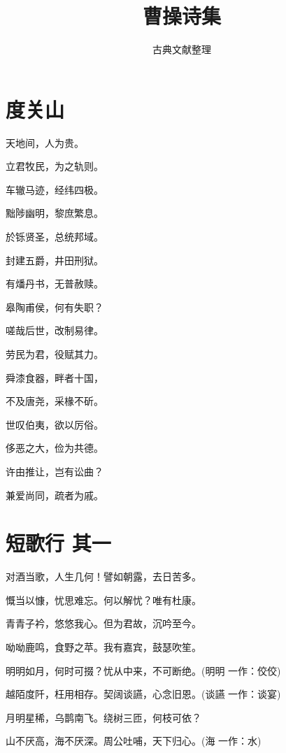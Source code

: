 \documentclass[12pt,a4paper]{ctexbook}
\title{曹操诗集}
\author{古典文献整理}
\date{}
\begin{document}
\maketitle
\tableofcontents
\newpage
\section{度关山}
天地间，人为贵。\par
立君牧民，为之轨则。\par
车辙马迹，经纬四极。\par
黜陟幽明，黎庶繁息。\par
於铄贤圣，总统邦域。\par
封建五爵，井田刑狱。\par
有燔丹书，无普赦赎。\par
皋陶甫侯，何有失职？\par
嗟哉后世，改制易律。\par
劳民为君，役赋其力。\par
舜漆食器，畔者十国，\par
不及唐尧，采椽不斫。\par
世叹伯夷，欲以厉俗。\par
侈恶之大，俭为共德。\par
许由推让，岂有讼曲？\par
兼爱尚同，疏者为戚。\par

\section{短歌行 其一}
对酒当歌，人生几何！譬如朝露，去日苦多。\par
慨当以慷，忧思难忘。何以解忧？唯有杜康。\par
青青子衿，悠悠我心。但为君故，沉吟至今。\par
呦呦鹿鸣，食野之苹。我有嘉宾，鼓瑟吹笙。\par
明明如月，何时可掇？忧从中来，不可断绝。(明明 一作：佼佼)\par
越陌度阡，枉用相存。契阔谈讌，心念旧恩。(谈讌 一作：谈宴)\par
月明星稀，乌鹊南飞。绕树三匝，何枝可依？\par
山不厌高，海不厌深。周公吐哺，天下归心。(海 一作：水)\par
\end{document}
